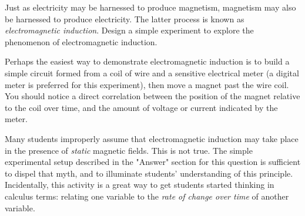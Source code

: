 

Just as electricity may be harnessed to produce magnetism, magnetism may also be harnessed to produce electricity.  The latter process is known as {\it electromagnetic induction}.  Design a simple experiment to explore the phenomenon of electromagnetic induction.







Perhaps the easiest way to demonstrate electromagnetic induction is to build a simple circuit formed from a coil of wire and a sensitive electrical meter (a digital meter is preferred for this experiment), then move a magnet past the wire coil.  You should notice a direct correlation between the position of the magnet relative to the coil over time, and the amount of voltage or current indicated by the meter.







Many students improperly assume that electromagnetic induction may take place in the presence of {\it static} magnetic fields.  This is not true.  The simple experimental setup described in the "Answer" section for this question is sufficient to dispel that myth, and to illuminate students' understanding of this principle.  Incidentally, this activity is a great way to get students started thinking in calculus terms: relating one variable to the {\it rate of change over time} of another variable.





